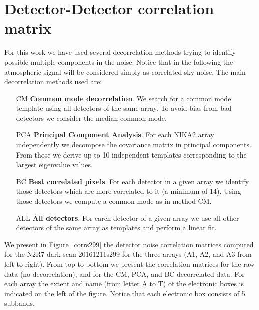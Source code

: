 \section{Detector-Detector correlation matrix}

For this work we have used several decorrelation methods trying to identify possible multiple components in the noise. Notice that in the following the atmospheric signal will be considered simply as correlated sky noise. The main decorrelation methods used are:

\begin{enumerate}
\item[CM] {\bf Common mode decorrelation}. We search for a common mode template using all detectors of the same array. To avoid bias from bad detectors we consider the median common mode.

\item[PCA] {\bf Principal Component Analysis}. For each NIKA2 array independently we decompose the covariance matrix in principal components. From those we derive up to 10 independent templates corresponding to the largest eigenvalue values.

\item[BC] {\bf Best correlated pixels}. For each detector in a given array we identify those detectors which are more correlated to it (a minimum of 14). Using those detectors we compute a common mode as in method CM. 

\item[ALL] {\bf All detectors}. For earch detector of a given array we use all other detectors of the same array as templates and perform a linear fit.

\end{enumerate}

We present in Figure~\ref{corrs299} the detector noise correlation matrices computed for the N2R7 dark scan 20161211s299 for the three arrays (A1, A2, and A3 from left to right). From top to bottom we present the correlation matrices for the raw data (no decorrelation), and for the CM, PCA, and BC decorrelated data. For each array the extent and name (from letter A to T) of the electronic boxes is indicated on the left of the figure. Notice that each electronic box consists of 5 subbands. \\

